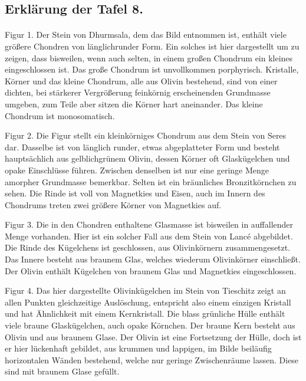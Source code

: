 \documentclass[a4paper, 11pt, oneside, polutonikogreek, german]{article}
\begin{document}
\subsection{Erklärung der Tafel 8.}
\paragraph{}
Figur 1. Der Stein von Dhurmsala, dem das Bild entnommen ist, enthält viele größere Chondren von länglichrunder Form. Ein solches ist hier dargestellt um zu zeigen, dass bisweilen, wenn auch selten, in einem großen Chondrum ein kleines eingeschlossen ist. Das große Chondrum ist unvollkommen porphyrisch. Kristalle, Körner und das kleine Chondrum, alle aus Olivin bestehend, sind von einer dichten, bei stärkerer Vergrößerung feinkörnig erscheinenden Grundmasse umgeben, zum Teile aber sitzen die Körner hart aneinander. Das kleine Chondrum ist monosomatisch.

Figur 2. Die Figur stellt ein kleinkörniges Chondrum aus dem Stein von Seres dar. Dasselbe ist von länglich runder, etwas abgeplatteter Form und besteht hauptsächlich aus gelblichgrünem Olivin, dessen Körner oft Glaskügelchen und opake Einschlüsse führen. Zwischen denselben ist nur eine geringe Menge amorpher Grundmasse bemerkbar. Selten ist ein bräunliches Bronzitkörnchen zu sehen. Die Rinde ist voll von Magnetkies und Eisen, auch im Innern des Chondrums treten zwei größere Körner von Magnetkies auf.

Figur 3. Die in den Chondren enthaltene Glasmasse ist bisweilen in auffallender Menge vorhanden. Hier ist ein solcher Fall aus dem Stein von Lancé abgebildet. Die Rinde des Kügelchens ist geschlossen, aus Olivinkörnern zusammengesetzt. Das Innere besteht aus braunem Glas, welches wiederum Olivinkörner einschließt. Der Olivin enthält Kügelchen von braunem Glas und Magnetkies eingeschlossen.

Figur 4. Das hier dargestellte Olivinkügelchen im Stein von Tieschitz zeigt an allen Punkten gleichzeitige Auslöschung, entspricht also einem einzigen Kristall und hat Ähnlichkeit mit einem Kernkristall. Die blass grünliche Hülle enthält viele braune Glaskügelchen, auch opake Körnchen. Der braune Kern besteht aus Olivin und aus braunem Glase. Der Olivin ist eine Fortsetzung der Hülle, doch ist er hier lückenhaft gebildet, aus krummen und lappigen, im Bilde beiläufig horizontalen Wänden bestehend, welche nur geringe Zwischenräume lassen. Diese sind mit braunem Glase gefüllt.
\clearpage
\end{document}
